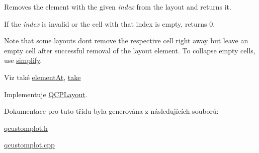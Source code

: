 Removes the element with the given {\itshape index} from the layout and returns it. 

If the {\itshape index} is invalid or the cell with that index is empty, returns 0.

Note that some layouts don\textquotesingle{}t remove the respective cell right away but leave an empty cell after successful removal of the layout element. To collapse empty cells, use \hyperlink{classQCPLayoutInset_abb9eb23bf2d7c587a8abe02d065eae0a}{simplify}.

\begin{DoxySeeAlso}{Viz také}
\hyperlink{classQCPLayoutInset_ab096d07b08f9b5455647f3ba7ff60e27}{element\+At}, \hyperlink{classQCPLayoutInset_a9ac707ccff650633b97f52dd5cddcf49}{take} 
\end{DoxySeeAlso}


Implementuje \hyperlink{classQCPLayout_a5a79621fa0a6eabb8b520cfc04fb601a}{Q\+C\+P\+Layout}.



Dokumentace pro tuto třídu byla generována z následujících souborů\+:\begin{DoxyCompactItemize}
\item 
\hyperlink{qcustomplot_8h}{qcustomplot.\+h}\item 
\hyperlink{qcustomplot_8cpp}{qcustomplot.\+cpp}\end{DoxyCompactItemize}
